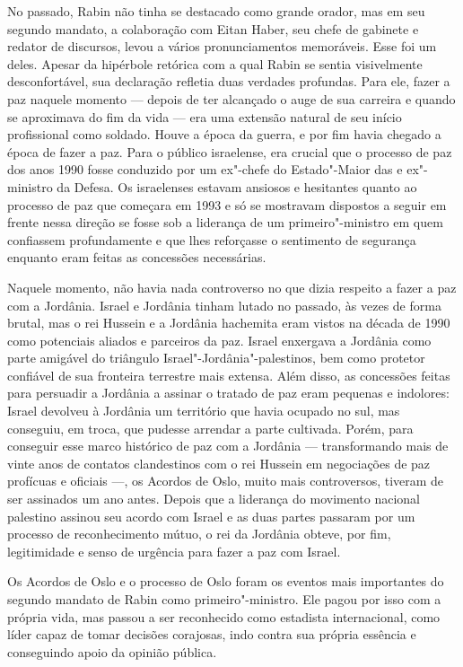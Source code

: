 No passado, Rabin não tinha se destacado como grande orador, mas em seu
segundo mandato, a colaboração com Eitan Haber, seu chefe de gabinete e
redator de discursos, levou a vários pronunciamentos memoráveis. Esse foi um
deles. Apesar da hipérbole retórica com a qual Rabin se sentia
visivelmente desconfortável, sua declaração refletia duas verdades
profundas. Para ele, fazer a paz naquele momento --- depois de ter
alcançado o auge de sua carreira e quando se aproximava do fim da vida
--- era uma extensão natural de seu início profissional como soldado.
Houve a época da guerra, e por fim havia chegado a época de fazer a paz.
Para o público israelense, era crucial que o processo de paz dos anos
1990 fosse conduzido por um ex"-chefe do Estado"-Maior das  e
ex"-ministro da Defesa. Os israelenses estavam ansiosos e hesitantes
quanto ao processo de paz que começara em 1993 e só se mostravam
dispostos a seguir em frente nessa direção se fosse sob a liderança de
um primeiro"-ministro em quem confiassem profundamente e que lhes
reforçasse o sentimento de segurança enquanto eram feitas as concessões
necessárias.

Naquele momento, não havia nada controverso no que dizia respeito a
fazer a paz com a Jordânia. Israel e Jordânia tinham lutado no passado,
às vezes de forma brutal, mas o rei Hussein e a Jordânia hachemita eram
vistos na década de 1990 como potenciais aliados e parceiros da paz.
Israel enxergava a Jordânia como parte amigável do triângulo
Israel"-Jordânia"-palestinos, bem como protetor confiável de sua fronteira
terrestre mais extensa. Além disso, as concessões feitas para persuadir
a Jordânia a assinar o tratado de paz eram pequenas e indolores: Israel
devolveu à Jordânia um território que havia ocupado no sul, mas
conseguiu, em troca, que pudesse arrendar a parte cultivada. Porém, para
conseguir esse marco histórico de paz com a Jordânia --- transformando
mais de vinte anos de contatos clandestinos com o rei Hussein em
negociações de paz profícuas e oficiais ---, os Acordos de Oslo, muito
mais controversos, tiveram de ser assinados um ano antes. Depois que a
liderança do movimento nacional palestino assinou seu acordo com Israel
e as duas partes passaram por um processo de reconhecimento mútuo, o rei
da Jordânia obteve, por fim, legitimidade e senso de urgência para fazer a
paz com Israel.

Os Acordos de Oslo e o processo de Oslo foram os eventos mais
importantes do segundo mandato de Rabin como primeiro"-ministro. Ele
pagou por isso com a própria vida, mas passou a ser reconhecido como
estadista internacional, como líder capaz de tomar decisões corajosas,
indo contra sua própria essência e conseguindo apoio da opinião pública.

